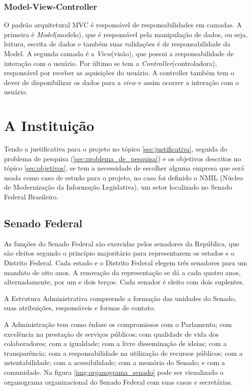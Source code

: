 \subsubsection{Model-View-Controller}
\label{sec:mvc}

O padrão arquitetural MVC é responsável de responsabilidades em camadas. A primeira é \textit{Model}(modelo), que é responsável pela manipulação de dados, ou seja, leitura, escrita de dados e também suas validações é de responsabilidade da Model. A segunda camada é a \textit{View}(visão), que possui a responsabilidade de interação com o usuário. Por último se tem a \textit{Controller}(controladora), responsável por receber as aquisições do usuário. A controller também tem o dever de disponibilizar os dados para a \textit{view} e assim ocorrer a interação com o usuário.

\section{A Instituição}

Tendo a justificativa para o projeto no tópico \ref{sec:justificativa}, seguida do problema de pesquisa (\ref{sec:problema_de_pesquisa}) e os objetivos descritos no tópico \ref{sec:objetivos}, se tem a necessidade de escolher alguma empresa que será usada como caso de estudo para o projeto, no caso foi definido o NMIL (Núcleo de Modernização da Informação Legislativa), um setor localizado no Senado Federal Brasileiro.

\subsection{Senado Federal}

As funções do Senado Federal são exercidas pelos senadores da República, que são eleitos segundo o princípio majoritário para representarem os estados e o Distrito Federal. Cada estado e o Distrito Federal elegem três senadores para um mandato de oito anos. A renovação da representação se dá a cada quatro anos, alternadamente, por um e dois terços. Cada senador é eleito com dois suplentes.

A Estrutura Administrativa compreende a formação das unidades do Senado, suas
atribuições, responsáveis e formas de contato.

A Administração tem como ênfase os compromissos com o Parlamento; com excelência na prestação de serviços públicos; com qualidade de vida dos colaboradores; com a igualdade; com a livre disseminação de ideias; com a transparência; com a responsabilidade na utilização
de recursos públicos; com a ustentabilidade; com a acessibilidade; com a memória do Senado; e com a comunidade. Na figura \ref{img:organograma_senado} pode ser visualizado o organograma organizacional do Senado Federal com suas casas e secretárias.

